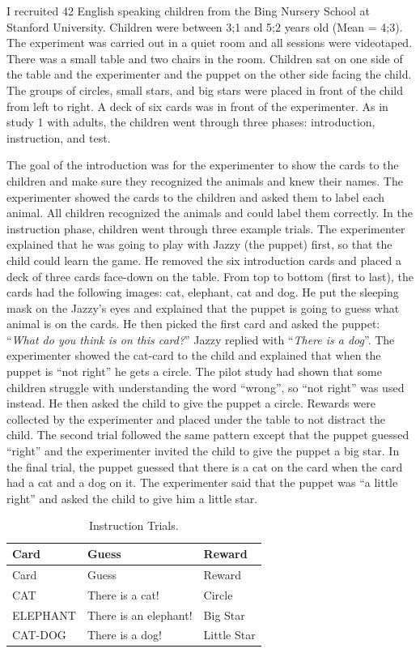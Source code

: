 \documentclass[man]{apa6}
\theoremstyle{definition}
\theoremstyle{definition}
\theoremstyle{definition}
\theoremstyle{remark}
\begin{document}
I recruited 42 English speaking children from the Bing Nursery School at
Stanford University. Children were between 3;1 and 5;2 years old (Mean =
4;3). The experiment was carried out in a quiet room and all sessions
were videotaped. There was a small table and two chairs in the room.
Children sat on one side of the table and the experimenter and the
puppet on the other side facing the child. The groups of circles, small
stars, and big stars were placed in front of the child from left to
right. A deck of six cards was in front of the experimenter. As in study
1 with adults, the children went through three phases: introduction,
instruction, and test.

The goal of the introduction was for the experimenter to show the cards
to the children and make sure they recognized the animals and knew their
names. The experimenter showed the cards to the children and asked them
to label each animal. All children recognized the animals and could
label them correctly. In the instruction phase, children went through
three example trials. The experimenter explained that he was going to
play with Jazzy (the puppet) first, so that the child could learn the
game. He removed the six introduction cards and placed a deck of three
cards face-down on the table. From top to bottom (first to last), the
cards had the following images: cat, elephant, cat and dog. He put the
sleeping mask on the Jazzy's eyes and explained that the puppet is going
to guess what animal is on the cards. He then picked the first card and
asked the puppet: \enquote{\emph{What do you think is on this card?}}
Jazzy replied with \enquote{\emph{There is a dog}}. The experimenter
showed the cat-card to the child and explained that when the puppet is
\enquote{not right} he gets a circle. The pilot study had shown that
some children struggle with understanding the word \enquote{wrong}, so
\enquote{not right} was used instead. He then asked the child to give
the puppet a circle. Rewards were collected by the experimenter and
placed under the table to not distract the child. The second trial
followed the same pattern except that the puppet guessed \enquote{right}
and the experimenter invited the child to give the puppet a big star. In
the final trial, the puppet guessed that there is a cat on the card when
the card had a cat and a dog on it. The experimenter said that the
puppet was \enquote{a little right} and asked the child to give him a
little star.

\begin{longtable}[]{@{}lll@{}}
\caption{\label{tab:instruction} Instruction Trials.}\tabularnewline
\toprule
Card & Guess & Reward\tabularnewline
\midrule
\endfirsthead
\toprule
Card & Guess & Reward\tabularnewline
\midrule
\endhead
CAT & There is a cat! & Circle\tabularnewline
ELEPHANT & There is an elephant! & Big Star\tabularnewline
CAT-DOG & There is a dog! & Little Star\tabularnewline
\bottomrule
\end{longtable}
\end{document}
